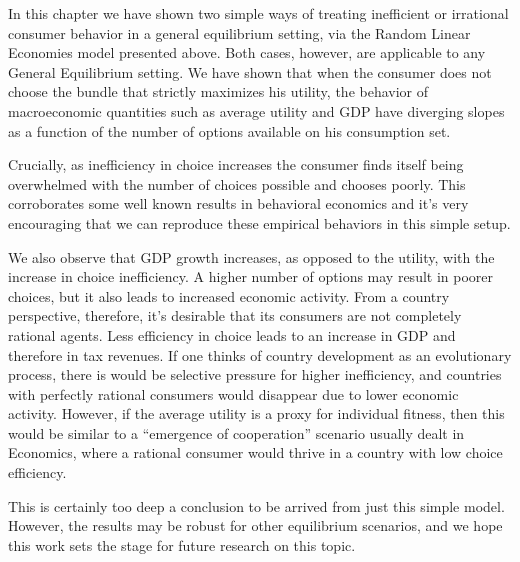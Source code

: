 In this chapter we have shown two simple ways of treating
inefficient or irrational consumer behavior in a general equilibrium
setting, via the Random Linear Economies model presented above. Both
cases, however, are applicable to any General Equilibrium setting. We
have shown that when the consumer does not choose the bundle that
strictly maximizes his utility, the behavior of macroeconomic
quantities such as average utility and GDP have diverging slopes as a
function of the number of options available on his consumption set.

Crucially, as inefficiency in choice increases the consumer finds
itself being overwhelmed with the number of choices possible and
chooses poorly. This corroborates some well known results in
behavioral economics \cite{Lepper00, Schwartz02} and it's very
encouraging that we can reproduce these empirical behaviors in this
simple setup.

We also observe that GDP growth increases, as opposed to the utility,
with the increase in choice inefficiency. A higher number of options
may result in poorer choices, but it also leads to increased economic
activity. From a country perspective, therefore, it's desirable that
its consumers are not completely rational agents. Less efficiency in
choice leads to an increase in GDP and therefore in tax revenues. If
one thinks of country development as an evolutionary process, there is
would be selective pressure for higher inefficiency, and countries
with perfectly rational consumers would disappear due to lower
economic activity. However, if the average utility is a proxy for
individual fitness, then this would be similar to a ``emergence of
cooperation'' scenario usually dealt in Economics, where a rational
consumer would thrive in a country with low choice efficiency.

This is certainly too deep a conclusion to be arrived from just this
simple model. However, the results may be robust for other equilibrium
scenarios, and we hope this work sets the stage for future research
on this topic.